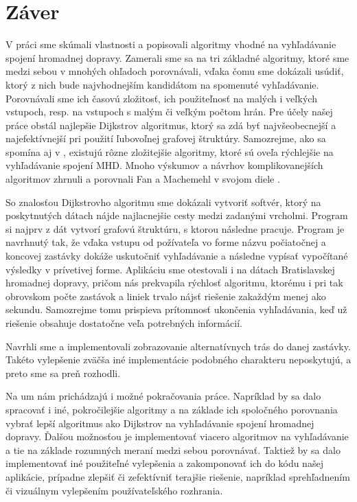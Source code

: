 \chapter*{Záver}  %

V práci sme skúmali vlastnosti a popisovali algoritmy vhodné na vyhľadávanie spojení hromadnej dopravy. Zamerali sme sa na tri základné algoritmy, ktoré sme medzi sebou v mnohých ohľadoch porovnávali, vďaka čomu sme dokázali usúdiť, ktorý z nich bude najvhodnejším kandidátom na spomenuté vyhľadávanie. Porovnávali sme ich časovú zložitosť, ich použiteľnosť na malých i veľkých vstupoch, resp. na vstupoch s malým či veľkým počtom hrán. Pre účely našej práce obstál najlepšie Dijkstrov algoritmus, ktorý sa zdá byť najvšeobecnejší a najefektívnejší pri použití ľubovoľnej grafovej štruktúry. Samozrejme, ako sa spomína aj v \cite{bast2010fast}, existujú rôzne zložitejšie algoritmy, ktoré sú oveľa rýchlejšie na vyhľadávanie spojení MHD. Mnoho výskumov a návrhov komplikovanejších algoritmov zhrnuli a porovnali Fan a Machemehl v svojom diele \cite{fan2004optimal}.

So znalosťou Dijkstrovho algoritmu sme dokázali vytvoriť softvér, ktorý na poskytnutých dátach nájde najlacnejšie cesty medzi zadanými vrcholmi. Program si najprv z dát vytvorí grafovú štruktúru, s ktorou následne pracuje. Program je navrhnutý tak, že vďaka vstupu od požívateľa vo forme názvu počiatočnej a koncovej zastávky dokáže uskutočniť vyhľadávanie a následne vypísať vypočítané výsledky v prívetivej forme. Aplikáciu sme otestovali i na dátach Bratislavskej hromadnej dopravy, pričom nás prekvapila rýchlosť algoritmu, ktorému i pri tak obrovskom počte zastávok a liniek trvalo nájsť riešenie zakaždým menej ako sekundu. Samozrejme tomu prispieva prítomnosť ukončenia vyhľadávania, keď už riešenie obsahuje dostatočne veľa potrebných informácií.

Navrhli sme a implementovali zobrazovanie alternatívnych trás do danej zastávky. Takéto vylepšenie zväčša iné implementácie podobného charakteru neposkytujú, a preto sme sa preň rozhodli.

Na um nám prichádzajú i možné pokračovania práce. Napríklad by sa dalo spracovať i iné, pokročilejšie algoritmy a na základe ich spoločného porovnania vybrať lepší algoritmus ako Dijkstrov na vyhľadávanie spojení hromadnej dopravy. Ďalšou možnosťou je implementovať viacero algoritmov na vyhľadávanie a tie na základe rozumných meraní medzi sebou porovnávať. Taktiež by sa dalo implementovať iné použiteľné vylepšenia a zakomponovať ich do kódu našej aplikácie, prípadne zlepšiť či zefektívniť terajšie riešenie, napríklad sprehľadnením či vizuálnym vylepšením používateľského rozhrania.

